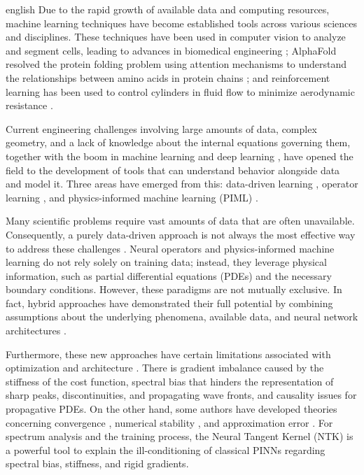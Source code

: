 \documentclass[11pt,letterpaper,twoside,openright]{book} %
\begin{document}
\begin{hyphenrules}{english}
Due to the rapid growth of available data and computing resources, machine learning techniques have
become established tools across various sciences and disciplines. These techniques have been used in
computer vision to analyze and segment cells, leading to advances in biomedical engineering
\cite{ronneberger2015}; AlphaFold resolved the protein folding problem using attention mechanisms
to understand the relationships between amino acids in protein chains \cite{jumper2021}; and
reinforcement learning has been used to control cylinders in fluid flow to minimize aerodynamic
resistance \cite{rabault2019}.

Current engineering challenges involving large amounts of data, complex geometry, and a lack of
knowledge about the internal equations governing them, together with the boom in machine learning and
deep learning \cite{bishop2006,goodfellow2016,bach2024}, have opened the field to the development
of tools that can understand behavior alongside data and model it. Three areas have emerged from this:
data-driven learning \cite{fiorini2025,brunton2016,chen2018}, operator learning
\cite{kovachki2021,li2021fno}, and physics-informed machine learning (PIML)
\cite{raissi2019,cuomo2022}.

Many scientific problems require vast amounts of data that are often unavailable. Consequently, a
purely data-driven approach is not always the most effective way to address these challenges
\cite{wu2020}. Neural operators and physics-informed machine learning do not rely solely on
training data; instead, they leverage physical information, such as partial differential equations
(PDEs) and the necessary boundary conditions. However, these paradigms are not mutually exclusive. In
fact, hybrid approaches have demonstrated their full potential by combining assumptions about the
underlying phenomena, available data, and neural network architectures
\cite{raissi2020hidden,kissas2020,nguyen2022}.

Furthermore, these new approaches have certain limitations associated with optimization \cite{wang2021gradient,wang2022ntk,krishnapriyan2021,deshpande2022,nguyen2023} and architecture \cite{rahaman2019,cao2020spectral,wang2021deeponet}. There is gradient imbalance caused by the stiffness of the cost function, spectral bias that hinders the representation of sharp peaks, discontinuities, and propagating wave fronts, and causality issues for propagative PDEs. On the other
hand, some authors have developed theories concerning convergence
\cite{mishra2025,siegel2024,shin2020convergence}, numerical stability
\cite{deryck2024acta,dong2024}, and approximation error \cite{zeinhofer2024,chantada2024}.
For spectrum analysis and the training process, the Neural Tangent Kernel (NTK) is a powerful tool to
explain the ill-conditioning of classical PINNs \cite{jacot2018,wang2022ntk} regarding spectral
bias, stiffness, and rigid gradients.


\end{hyphenrules}
\end{document}
